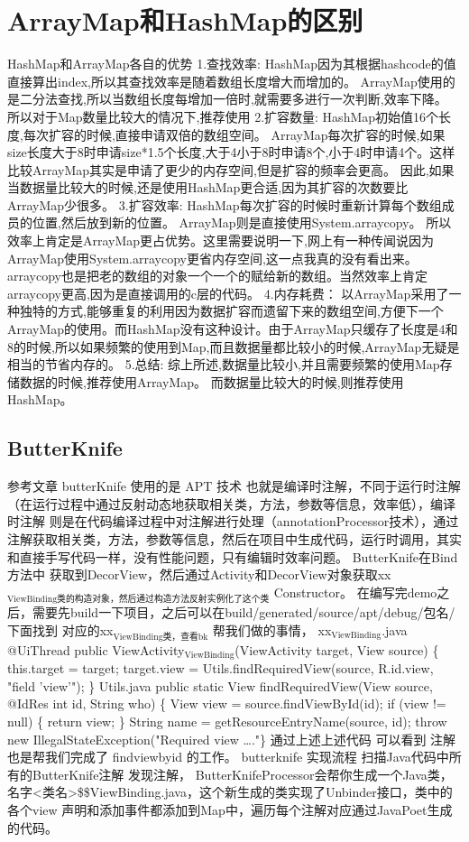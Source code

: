 \documentclass[9pt, b5paper]{article}
\begin{document}
\section{ArrayMap和HashMap的区别}
\label{sec-10}
HashMap和ArrayMap各自的优势
1.查找效率:
HashMap因为其根据hashcode的值直接算出index,所以其查找效率是随着数组长度增大而增加的。
ArrayMap使用的是二分法查找,所以当数组长度每增加一倍时,就需要多进行一次判断,效率下降。
所以对于Map数量比较大的情况下,推荐使用
2.扩容数量:
HashMap初始值16个长度,每次扩容的时候,直接申请双倍的数组空间。
ArrayMap每次扩容的时候,如果size长度大于8时申请size*1.5个长度,大于4小于8时申请8个,小于4时申请4个。这样比较ArrayMap其实是申请了更少的内存空间,但是扩容的频率会更高。
因此,如果当数据量比较大的时候,还是使用HashMap更合适,因为其扩容的次数要比ArrayMap少很多。
3.扩容效率:
HashMap每次扩容的时候时重新计算每个数组成员的位置,然后放到新的位置。
ArrayMap则是直接使用System.arraycopy。
所以效率上肯定是ArrayMap更占优势。这里需要说明一下,网上有一种传闻说因为ArrayMap使用System.arraycopy更省内存空间,这一点我真的没有看出来。arraycopy也是把老的数组的对象一个一个的赋给新的数组。当然效率上肯定arraycopy更高,因为是直接调用的c层的代码。
4.内存耗费：
以ArrayMap采用了一种独特的方式,能够重复的利用因为数据扩容而遗留下来的数组空间,方便下一个ArrayMap的使用。而HashMap没有这种设计。由于ArrayMap只缓存了长度是4和8的时候,所以如果频繁的使用到Map,而且数据量都比较小的时候,ArrayMap无疑是相当的节省内存的。
5.总结:
综上所述,数据量比较小,并且需要频繁的使用Map存储数据的时候,推荐使用ArrayMap。
而数据量比较大的时候,则推荐使用HashMap。
\subsection{ButterKnife}
\label{sec-10-1}
参考文章
butterKnife 使用的是 APT 技术 也就是编译时注解，不同于运行时注解（在运行过程中通过反射动态地获取相关类，方法，参数等信息，效率低），编译时注解 则是在代码编译过程中对注解进行处理（annotationProcessor技术），通过注解获取相关类，方法，参数等信息，然后在项目中生成代码，运行时调用，其实和直接手写代码一样，没有性能问题，只有编辑时效率问题。
ButterKnife在Bind方法中 获取到DecorView，然后通过Activity和DecorView对象获取xx$_{\text{ViewBinding类的构造对象，然后通过构造方法反射实例化了这个类}}$ Constructor。
在编写完demo之后，需要先build一下项目，之后可以在build/generated/source/apt/debug/包名/下面找到 对应的xx$_{\text{ViewBinding类，查看bk}}$ 帮我们做的事情，
xx$_{\text{ViewBinding}}$.java
@UiThread
  public ViewActivity$_{\text{ViewBinding}}$(ViewActivity target, View source) \{
    this.target = target;
    target.view = Utils.findRequiredView(source, R.id.view, "field 'view'");
  \}
Utils.java
public static View findRequiredView(View source, @IdRes int id, String who) \{
    View view = source.findViewById(id);
    if (view != null) \{
      return view;
    \}
    String name = getResourceEntryName(source, id);
    throw new IllegalStateException("Required view \ldots{}."\}
通过上述上述代码 可以看到 注解也是帮我们完成了 findviewbyid 的工作。
butterknife 实现流程
扫描Java代码中所有的ButterKnife注解
发现注解， ButterKnifeProcessor会帮你生成一个Java类，名字<类名>\$\$ViewBinding.java，这个新生成的类实现了Unbinder接口，类中的各个view 声明和添加事件都添加到Map中，遍历每个注解对应通过JavaPoet生成的代码。
\end{document}
